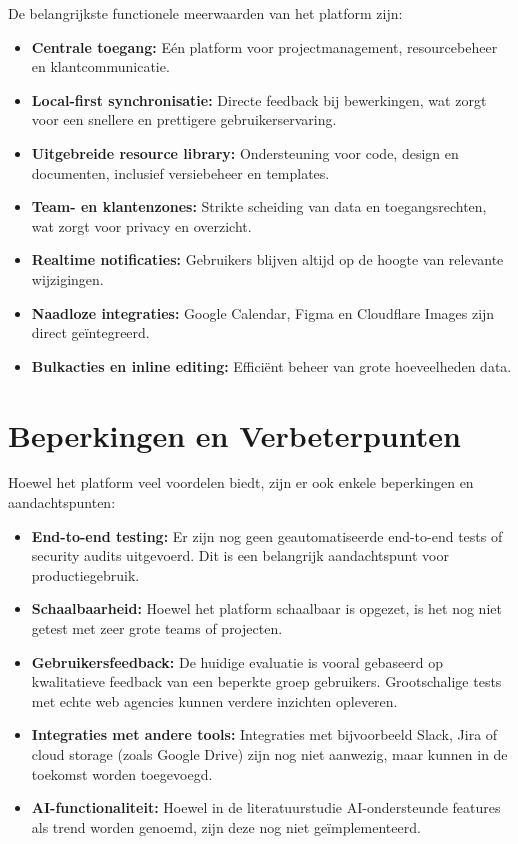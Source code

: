 De belangrijkste functionele meerwaarden van het platform zijn:
\begin{itemize}
    \item \textbf{Centrale toegang:} Eén platform voor projectmanagement, resourcebeheer en klantcommunicatie.
    \item \textbf{Local-first synchronisatie:} Directe feedback bij bewerkingen, wat zorgt voor een snellere en prettigere gebruikerservaring.
    \item \textbf{Uitgebreide resource library:} Ondersteuning voor code, design en documenten, inclusief versiebeheer en templates.
    \item \textbf{Team- en klantenzones:} Strikte scheiding van data en toegangsrechten, wat zorgt voor privacy en overzicht.
    \item \textbf{Realtime notificaties:} Gebruikers blijven altijd op de hoogte van relevante wijzigingen.
    \item \textbf{Naadloze integraties:} Google Calendar, Figma en Cloudflare Images zijn direct geïntegreerd.
    \item \textbf{Bulkacties en inline editing:} Efficiënt beheer van grote hoeveelheden data.
\end{itemize}

\section{Beperkingen en Verbeterpunten}
\label{sec:beperkingen}

Hoewel het platform veel voordelen biedt, zijn er ook enkele beperkingen en aandachtspunten:
\begin{itemize}
    \item \textbf{End-to-end testing:} Er zijn nog geen geautomatiseerde end-to-end tests of security audits uitgevoerd. Dit is een belangrijk aandachtspunt voor productiegebruik.
    \item \textbf{Schaalbaarheid:} Hoewel het platform schaalbaar is opgezet, is het nog niet getest met zeer grote teams of projecten.
    \item \textbf{Gebruikersfeedback:} De huidige evaluatie is vooral gebaseerd op kwalitatieve feedback van een beperkte groep gebruikers. Grootschalige tests met echte web agencies kunnen verdere inzichten opleveren.
    \item \textbf{Integraties met andere tools:} Integraties met bijvoorbeeld Slack, Jira of cloud storage (zoals Google Drive) zijn nog niet aanwezig, maar kunnen in de toekomst worden toegevoegd.
    \item \textbf{AI-functionaliteit:} Hoewel in de literatuurstudie AI-ondersteunde features als trend worden genoemd, zijn deze nog niet geïmplementeerd.
\end{itemize}

